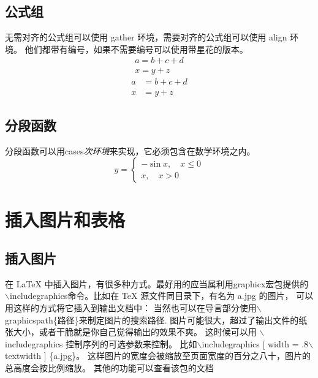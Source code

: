 \documentclass[12pt, a4paper, oneside, UTF8]{ctexart}
\begin{document}
\subsection{公式组}
无需对齐的公式组可以使用 gather 环境，需要对齐的公式组可以使用 align 环境。
他们都带有编号，如果不需要编号可以使用带星花的版本。
\begin{gather}
    a = b+c+d \\
    x = y+z
\end{gather}
\begin{align*}
    a &= b+c+d \\
    x &= y+z
\end{align*}
\subsection{分段函数}
分段函数可以用cases\textit{次环境}来实现，它必须包含在数学环境之内。
\begin{equation*}
    y=
    \begin{cases}
        -\sin{x},\quad x \leqslant 0 \\
        x,\quad x>0
    \end{cases} 
\end{equation*}
\section{插入图片和表格}
\subsection{插入图片}
在 LaTeX 中插入图片，有很多种方式。最好用的应当属利用graphicx宏包提供的
$\backslash$includegraphics命令。比如在 TeX 源文件同目录下，有名为 a.jpg 的图片，
可以用这样的方式将它插入到输出文档中：
当然也可以在导言部分使用$\backslash$graphicspath\{路径\}来制定图片的搜索路径.
图片可能很大，超过了输出文件的纸张大小，或者干脆就是你自己觉得输出的效果不爽。
这时候可以用 $\backslash$includegraphics 控制序列的可选参数来控制。
比如$\backslash$includegraphics [ width = .8$\backslash$ textwidth ] \{a.jpg\}。
这样图片的宽度会被缩放至页面宽度的百分之八十，图片的总高度会按比例缩放。
其他的功能可以查看该包的文档\\
\end{document}
